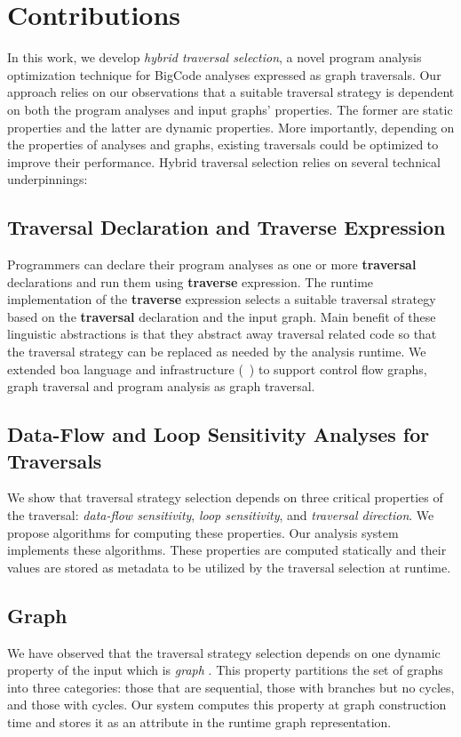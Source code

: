 \chapter{Contributions}

In this work, we develop {\em hybrid traversal selection}, a novel program
analysis optimization technique for BigCode analyses expressed as graph traversals.
Our approach relies on our observations that a suitable traversal strategy is
dependent on both the program analyses and input graphs' properties.
The former are static properties and the latter are dynamic properties.
More importantly, depending on the properties of analyses and graphs, existing
traversals could be optimized to improve their performance.  
Hybrid traversal selection relies on several technical underpinnings: 

\section{Traversal Declaration and Traverse Expression} 
Programmers can declare their program analyses
as one or more {\bf traversal} declarations and run them using {\bf traverse} expression.
The runtime implementation of the {\bf traverse} expression selects a suitable 
traversal strategy based on the {\bf traversal} declaration and the input graph.
Main benefit of these linguistic abstractions is that they abstract away 
traversal related code so that the traversal strategy can be replaced as needed 
by the analysis runtime. We extended boa language and infrastructure (~\cite{dyer2013boa}) to support control flow graphs, graph traversal and program analysis as graph traversal.

\section{Data-Flow and Loop Sensitivity Analyses for Traversals}
We show that traversal strategy selection depends on three critical properties
of the traversal: {\em data-flow sensitivity}, {\em loop sensitivity}, and 
{\em traversal direction}. We propose algorithms for computing these properties.
Our analysis system implements these algorithms.
These properties are computed statically and their values are stored as metadata 
to be utilized by the traversal selection at runtime.

\section{Graph \Graphprop{}}
We have observed that the traversal strategy selection depends on one
dynamic property of the input which is {\em graph \graphprop{}}. This property partitions
the set of graphs into three categories: those that are sequential, those with branches
but no cycles, and those with cycles. Our system computes this property at 
graph construction time and stores it as an attribute in the runtime graph representation. 

